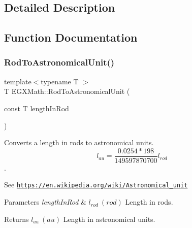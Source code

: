 \subsection{Detailed Description}


\subsection{Function Documentation}
\mbox{\label{group___e_g_x_math-_conversions-_length_conversions-_imperial-_rod-_astronomical_ga320c74af81e2f062967e5c767d089a87}} 
\subsubsection{\texorpdfstring{Rod\+To\+Astronomical\+Unit()}{RodToAstronomicalUnit()}}
{\footnotesize\ttfamily template$<$typename T $>$ \\
T E\+G\+X\+Math\+::\+Rod\+To\+Astronomical\+Unit (\begin{DoxyParamCaption}\item[{const T}]{length\+In\+Rod }\end{DoxyParamCaption})}



Converts a length in rods to astronomical units. \[ l_{au}=\frac{0.0254 * 198}{149597870700} l_{rod} \]. 

See \href{https://en.wikipedia.org/wiki/Astronomical_unit}{\tt https\+://en.\+wikipedia.\+org/wiki/\+Astronomical\+\_\+unit} 
\begin{DoxyParams}{Parameters}
{\em length\+In\+Rod} & $ l_{rod}\ (rod)$ Length in rods. \\
\hline
\end{DoxyParams}
\begin{DoxyReturn}{Returns}
$ l_{au}\ (au)$ Length in astronomical units. 
\end{DoxyReturn}
\mbox{\label{group___e_g_x_math-_conversions-_length_conversions-_imperial-_rod-_astronomical_gae5824aa8a60a3fe280de82b165cc0ed7}} 
